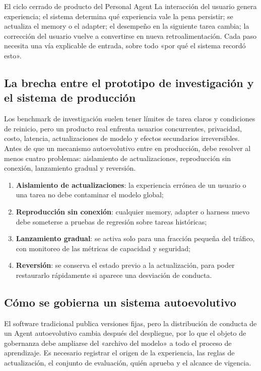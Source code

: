 \begin{importantbox}{El ciclo cerrado de producto del Personal Agent}
La interacción del usuario genera experiencia; el sistema determina qué experiencia vale la pena persistir; se actualiza el memory o el adapter; el desempeño en la siguiente tarea cambia; la corrección del usuario vuelve a convertirse en nueva retroalimentación. Cada paso necesita una vía explicable de entrada, sobre todo «por qué el sistema recordó esto».
\end{importantbox}

\subsection{La brecha entre el prototipo de investigación y el sistema de producción}

Los benchmark de investigación suelen tener límites de tarea claros y condiciones de reinicio, pero un producto real enfrenta usuarios concurrentes, privacidad, costo, latencia, actualizaciones de modelo y efectos secundarios irreversibles. Antes de que un mecanismo autoevolutivo entre en producción, debe resolver al menos cuatro problemas: aislamiento de actualizaciones, reproducción sin conexión, lanzamiento gradual y reversión.

\begin{enumerate}
    \item \textbf{Aislamiento de actualizaciones}: la experiencia errónea de un usuario o una tarea no debe contaminar el modelo global;
    \item \textbf{Reproducción sin conexión}: cualquier memory, adapter o harness nuevo debe someterse a pruebas de regresión sobre tareas históricas;
    \item \textbf{Lanzamiento gradual}: se activa solo para una fracción pequeña del tráfico, con monitoreo de las métricas de capacidad y seguridad;
    \item \textbf{Reversión}: se conserva el estado previo a la actualización, para poder restaurarlo rápidamente si aparece una desviación de conducta.
\end{enumerate}

\subsection{Cómo se gobierna un sistema autoevolutivo}

El software tradicional publica versiones fijas, pero la distribución de conducta de un Agent autoevolutivo cambia después del despliegue, por lo que el objeto de gobernanza debe ampliarse del «archivo del modelo» a todo el proceso de aprendizaje. Es necesario registrar el origen de la experiencia, las reglas de actualización, el conjunto de evaluación, quién aprueba y el alcance de vigencia.

